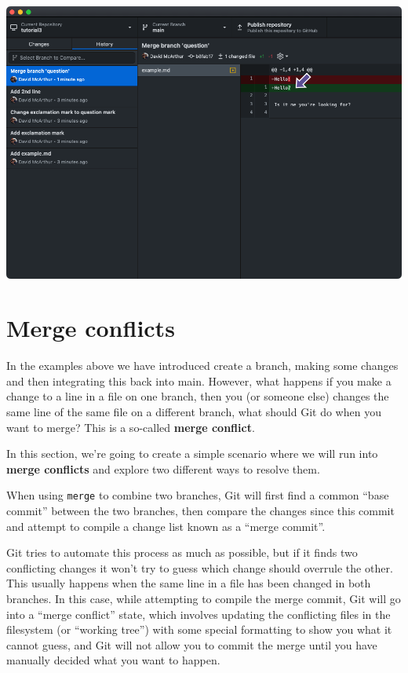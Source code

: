 \documentclass[
  letterpaper,
  DIV=11,
  numbers=noendperiod]{scrartcl}
\begin{document}
\includegraphics{images/image45.png}

\hypertarget{merge-conflicts}{%
\section{Merge conflicts}\label{merge-conflicts}}

In the examples above we have introduced create a branch, making some
changes and then integrating this back into main. However, what happens
if you make a change to a line in a file on one branch, then you (or
someone else) changes the same line of the same file on a different
branch, what should Git do when you want to merge? This is a so-called
\textbf{merge conflict}.

In this section, we're going to create a simple scenario where we will
run into \textbf{merge conflicts} and explore two different ways to
resolve them.

When using \texttt{merge} to combine two branches, Git will first find a
common ``base commit'' between the two branches, then compare the
changes since this commit and attempt to compile a change list known as
a ``merge commit''.

Git tries to automate this process as much as possible, but if it finds
two conflicting changes it won't try to guess which change should
overrule the other. This usually happens when the same line in a file
has been changed in both branches. In this case, while attempting to
compile the merge commit, Git will go into a ``merge conflict'' state,
which involves updating the conflicting files in the filesystem (or
``working tree'') with some special formatting to show you what it
cannot guess, and Git will not allow you to commit the merge until you
have manually decided what you want to happen.
\end{document}
